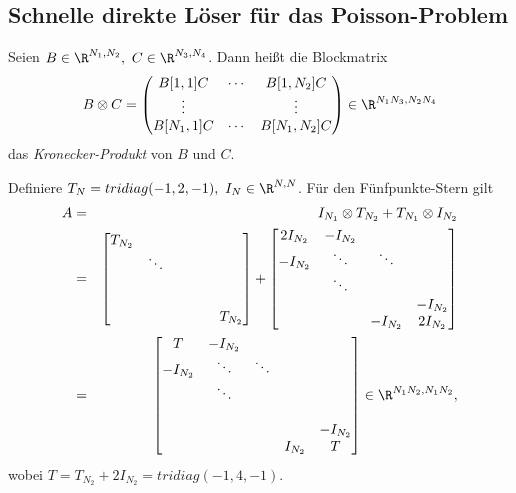\subsection{Schnelle direkte Löser für das Poisson-Problem}


\begin{Definition}
    Seien $B \in \R^{N_1, N_2}, \ C \in \R^{N_3, N_4}$. Dann heißt die
    Blockmatrix
    \begin{eqnarray*}
	B \otimes C = \begin{pmatrix}
                      B[1, 1]C & \cdots & B[1, N_2]C \\
                      \vdots & & \vdots \\
                      B[N_1, 1]C & \cdots & B[N_1, N_2]C
	              \end{pmatrix} \in \R^{N_1 N_3, N_2 N_4}
    \end{eqnarray*}
    das \emph{Kronecker-Produkt} von $B$ und $C$.
\end{Definition}


\begin{Beispiel}
    Definiere $T_N = tridiag(-1, 2, -1), \ I_N \in \R^{N, N}$.
    Für den Fünfpunkte-Stern gilt
    \begin{eqnarray*}
            A
        &=& I_{N_1} \otimes T_{N_2} + T_{N_1} \otimes I_{N_2} \\
        &=& \begin{bmatrix}
                T_{N_2} \\
                & \ddots \\
                \\
                \\
                & & & & & T_{N_2}
            \end{bmatrix}
         +  \begin{bmatrix}
                2 I_{N_2} & -I_{N_2} \\
                -I_{N_2} & \ddots & \ddots \\
                & \ddots \\
                & & & -I_{N_2} \\
                & & -I_{N_2} & 2 I_{N_2}
            \end{bmatrix} \\
        &=& \begin{bmatrix}
                T & -I_{N_2} \\
                -I_{N_2} & \ddots & \ddots \\
                & \ddots \\
                \\
                & & & & -I_{N_2} \\
                & & & I_{N_2} & T
            \end{bmatrix}
        \in \R^{N_1 N_2, N_1 N_2},
    \end{eqnarray*}
    wobei $T = T_{N_2} + 2 I_{N_2} = tridiag(-1, 4 , -1)$.
\end{Beispiel}


